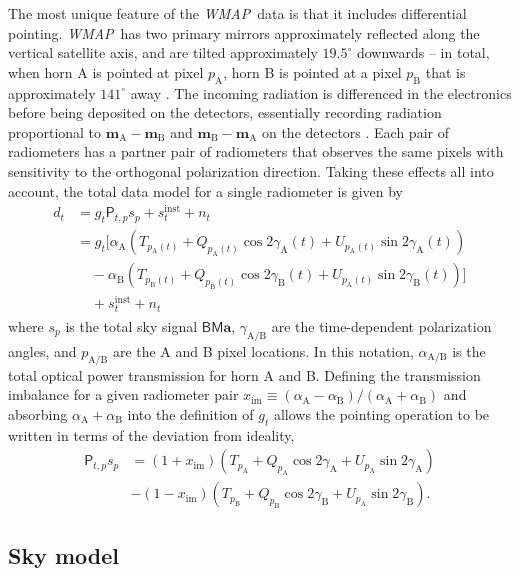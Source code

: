 \documentclass[twocolumn]{../../common/aa}
\def\WMAP{\emph{WMAP}}
\newcommand{\A}[0]{\mathrm{A}}
\newcommand{\B}[0]{\mathrm{B}}
\begin{document}
The most unique feature of the \WMAP\ data is that it includes differential pointing.  \WMAP\ has two primary mirrors approximately reflected along the vertical satellite axis, and are tilted approximately $19.5^\circ$ downwards -- in total, when horn A is pointed at pixel $p_\A$, horn B is pointed at a pixel $p_\B$ that is approximately $141^\circ$ away \citep{page2003:MAP}. The incoming radiation is differenced in the electronics before being deposited on the detectors, essentially recording radiation proportional to $\boldsymbol m_\A-\boldsymbol m_\B$ and $\boldsymbol m_\B-\boldsymbol m_\A$ on the detectors \citep{jarosik2003:MAP}. Each pair of radiometers has a partner pair of radiometers that observes the same pixels with sensitivity to the orthogonal polarization direction. Taking these effects all into account, the total data model for a single radiometer is given by
\begin{align}
	d_{t}&=g_{t}\mathsf P_{t,p}s_{p} + s^\mathrm{inst}_t+n_t
	\\
	&=g_t\Big[\alpha_\A(T_{p_\A(t)}+Q_{p_\A(t)}\cos2\gamma_\A(t) + U_{p_\A(t)}\sin2\gamma_\A(t))
	\nonumber
	\\
	&\phantom{g_t\Big[}-
	\alpha_\B(T_{p_\B(t)}+Q_{p_\B(t)}\cos2\gamma_\B(t) + U_{p_\A(t)}\sin2\gamma_\B(t))\Big]
	\nonumber
	\\
	&\phantom{g_t\Big[}
	+ s_t^\mathrm{inst}+n_t
\end{align}
where $s_p$ is the total sky signal $\mathsf B\mathsf M\boldsymbol a$, $\gamma_{\A/\B}$ are the time-dependent polarization angles, and $p_{\A/\B}$ are the A and B pixel locations.
In this notation, $\alpha_{\A/\B}$ is the total optical power transmission for horn A and B. Defining the transmission imbalance for a given radiometer pair $x_\mathrm{im}\equiv(\alpha_\A-\alpha_\B)/(\alpha_\A+\alpha_\B)$ and absorbing $\alpha_\A+\alpha_\B$ into the definition of $g_t$ allows the pointing operation to be written in terms of the deviation from ideality,
\begin{align}
	\mathsf P_{t,p}s_p
	&=(1+x_\mathrm{im})(T_{p_\A}+Q_{p_\A}\cos2\gamma_\A + U_{p_\A}\sin2\gamma_\A)
	\nonumber
	\\
	&
	-(1-x_\mathrm{im})(T_{p_\B}+Q_{p_\B}\cos2\gamma_\B + U_{p_\A}\sin2\gamma_\B).
\end{align}

\subsection{Sky model}
\end{document}
